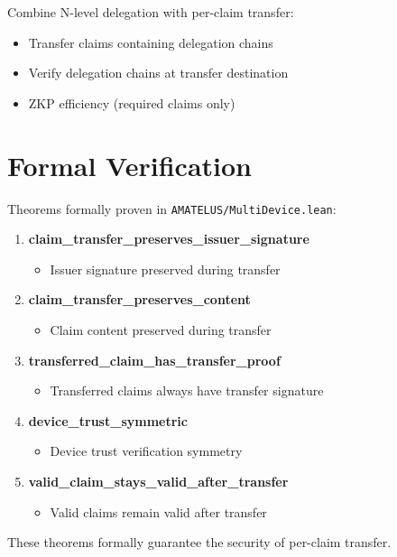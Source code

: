 Combine N-level delegation with per-claim transfer:

\begin{itemize}
  \item Transfer claims containing delegation chains
  \item Verify delegation chains at transfer destination
  \item ZKP efficiency (required claims only)
\end{itemize}

\section{Formal Verification}

Theorems formally proven in \texttt{AMATELUS/MultiDevice.lean}:

\begin{enumerate}
  \item \textbf{claim\_transfer\_preserves\_issuer\_signature}
    \begin{itemize}
      \item Issuer signature preserved during transfer
    \end{itemize}

  \item \textbf{claim\_transfer\_preserves\_content}
    \begin{itemize}
      \item Claim content preserved during transfer
    \end{itemize}

  \item \textbf{transferred\_claim\_has\_transfer\_proof}
    \begin{itemize}
      \item Transferred claims always have transfer signature
    \end{itemize}

  \item \textbf{device\_trust\_symmetric}
    \begin{itemize}
      \item Device trust verification symmetry
    \end{itemize}

  \item \textbf{valid\_claim\_stays\_valid\_after\_transfer}
    \begin{itemize}
      \item Valid claims remain valid after transfer
    \end{itemize}
\end{enumerate}

These theorems formally guarantee the security of per-claim transfer.

